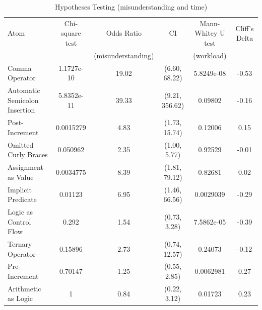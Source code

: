  \begin{table}[ht]
\caption{Hypotheses Testing (misunderstanding and time)}

 \centering
 \begin{tabular}{lccc|cc}
   \toprule
Atom  & Chi-square test & Odds Ratio          & CI & Mann-Whitey U test & Cliff's Delta \\ 
     &         & (misunderstanding)  &                    & (workload)             & \\ \midrule
Comma Operator & 1.1727e-10 & 19.02 & (6.60, 68.22) & 5.8249e-08 & -0.53 \\ 
Automatic Semicolon Insertion & 5.8352e-11 & 39.33 & (9.21, 356.62) & 0.09802 & -0.16 \\ 
Post-Increment & 0.0015279 & 4.83 & (1.73, 15.74) & 0.12006 & 0.15 \\ 
Omitted Curly Braces & 0.050962 & 2.35 & (1.00, 5.77) & 0.92529 & -0.01 \\ 
Assignment as Value & 0.0034775 & 8.39 & (1.81, 79.12) & 0.82681 & 0.02 \\ 
Implicit Predicate & 0.01123 & 6.95 & (1.46, 66.56) & 0.0029039 & -0.29 \\ 
Logic as Control Flow & 0.292 & 1.54 & (0.73, 3.28) & 7.5862e-05 & -0.39 \\ 
Ternary Operator & 0.15896 & 2.73 & (0.74, 12.57) & 0.24073 & -0.12 \\ 
Pre-Increment & 0.70147 & 1.25 & (0.55, 2.85) & 0.0062981 & 0.27 \\ 
Arithmetic as Logic & 1 & 0.84 & (0.22, 3.12) & 0.01723 & 0.23 \\ 
    \bottomrule
 \end{tabular}
 \label{tab:hypothesis-testing}
 \end{table}


